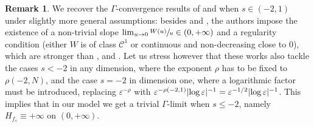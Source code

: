 \documentclass[JEP,XML,SOM,Unicode,published]{cedram}
\theoremstyle{plain}
\theoremstyle{definition}
\newtheorem{remark}[theorem]{Remark}
\newcommand{\Cspace}{\mathscr{C}}
\newcommand{\eps}{\varepsilon}
\DeclarePairedDelimiter{\abs}{\lvert}{\rvert}
\begin{document}
\begin{remark}
We recover the $\Gamma$-convergence results of \cite{bouchitteTransitionsPhasesAvec1996} and \cite{dubsProblemesPerturbationsSingulieres1998} when $s \in (-2,1)$ under slightly more general assumptions: besides  and , the authors impose the existence of a non-trivial slope $\lim_{u\to 0} \sfrac{W(u)}u \in (0,+\infty)$ and a regularity condition (either $W$ is of class $\Cspace^1$ or continuous and non-decreasing close to $0$), which are stronger than ,  and . Let us stress however that these works also tackle the cases $s < -2$ in any dimension, where the exponent $\rho$ has to be fixed to $\rho(-2,N)$, and the case $s=-2$ in dimension one, where a logarithmic factor must be introduced, replacing $\eps^{-\rho}$ with $\eps^{-\rho(-2,1)} \abs{\log\eps}^{-1} = \eps^{-1/2} \abs{\log \eps}^{-1}$. This implies that in our model we get a trivial $\Gamma$-limit when $s \leq -2$, namely $H_{f_s} \equiv +\infty$ on $(0,+\infty)$.
\end{remark}




\end{document}
